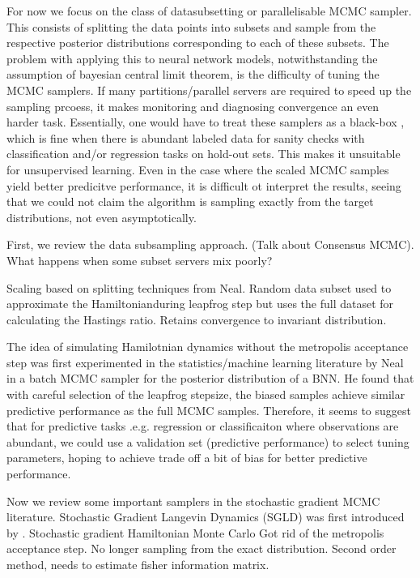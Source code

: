 \documentclass{book}
\begin{document}
\begin{enumerate}
For now we focus on the class of datasubsetting or parallelisable MCMC sampler. This consists of 
splitting the data points into subsets and sample from the respective posterior distributions corresponding to each of these subsets. The problem with applying this to neural network models, notwithstanding the assumption of bayesian central limit theorem, is the difficulty of tuning the MCMC samplers. If many partitions/parallel servers are required to speed up the sampling prcoess, it makes monitoring and diagnosing convergence an even harder task. Essentially, one would have to treat these samplers as a black-box \cite{breiman2001statistical}, which is fine when there is abundant labeled data for sanity checks with classification and/or regression tasks on hold-out sets. This makes it unsuitable for unsupervised learning. Even in the case where the scaled MCMC samples yield better predicitve performance, it is difficult ot interpret the results, seeing that we could not claim the algorithm is sampling exactly from the target distributions, not even asymptotically. 

First, we review the data subsampling approach. (Talk about Consensus MCMC). What happens when some subset servers mix poorly?     


Scaling based on splitting techniques from Neal. Random data subset used to approximate the Hamiltonianduring leapfrog step but uses the full dataset for calculating the Hastings ratio. Retains convergence to invariant distribution. 


The idea of simulating Hamilotnian dynamics without the metropolis acceptance step was first experimented in the statistics/machine learning literature by Neal \cite{neal1993bayesian} in a batch MCMC sampler for the posterior distribution of a BNN. He found that with careful selection of the leapfrog stepsize, the biased samples achieve similar predictive performance as the full MCMC samples. Therefore, it seems to suggest that for predictive tasks .e.g. regression or classificaiton where observations are abundant, we could 
use a validation set (predictive performance) to select tuning parameters, hoping to achieve trade off a bit of bias for better predictive performance. 

Now we review some important samplers in the stochastic gradient MCMC
literature. Stochastic Gradient Langevin Dynamics (SGLD) was first introduced by
\cite{welling2011bayesian}. 
Stochastic gradient Hamiltonian Monte Carlo
Got rid of the metropolis acceptance step. No longer sampling from the exact
distribution. Second order method, needs to estimate fisher information matrix.


\end{enumerate}
\end{document}
